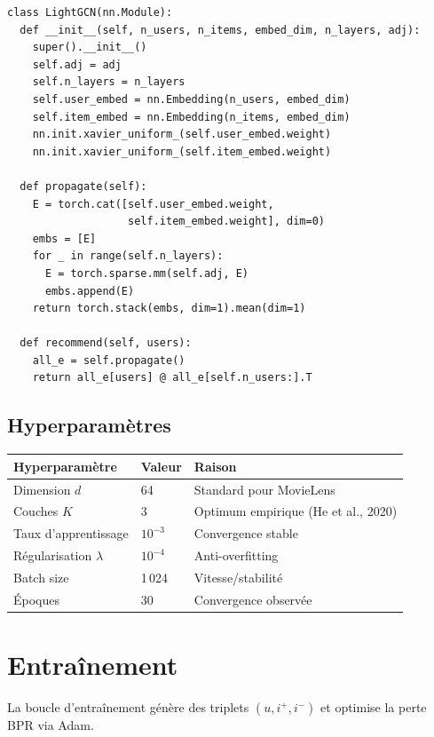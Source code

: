 \documentclass[12pt,a4paper]{report}
\begin{document}
\begin{lstlisting}[caption=Classe LightGCN simplifié]
class LightGCN(nn.Module):
  def __init__(self, n_users, n_items, embed_dim, n_layers, adj):
    super().__init__()
    self.adj = adj
    self.n_layers = n_layers
    self.user_embed = nn.Embedding(n_users, embed_dim)
    self.item_embed = nn.Embedding(n_items, embed_dim)
    nn.init.xavier_uniform_(self.user_embed.weight)
    nn.init.xavier_uniform_(self.item_embed.weight)

  def propagate(self):
    E = torch.cat([self.user_embed.weight,
                   self.item_embed.weight], dim=0)
    embs = [E]
    for _ in range(self.n_layers):
      E = torch.sparse.mm(self.adj, E)
      embs.append(E)
    return torch.stack(embs, dim=1).mean(dim=1)

  def recommend(self, users):
    all_e = self.propagate()
    return all_e[users] @ all_e[self.n_users:].T
\end{lstlisting}

\subsection{Hyperparamètres}

\begin{center}
\begin{tabular}{lll}
\toprule
\textbf{Hyperparamètre} & \textbf{Valeur} & \textbf{Raison} \\
\midrule
Dimension $d$ & 64 & Standard pour MovieLens \\
Couches $K$ & 3 & Optimum empirique (He et al., 2020) \\
Taux d'apprentissage & $10^{-3}$ & Convergence stable \\
Régularisation $\lambda$ & $10^{-4}$ & Anti-overfitting \\
Batch size & 1\,024 & Vitesse/stabilité \\
Époques & 30 & Convergence observée \\
\bottomrule
\end{tabular}
\end{center}

\section{Entraînement}

La boucle d'entraînement génère des triplets $(u, i^+, i^-)$ et optimise la
perte BPR via Adam.
\end{document}
